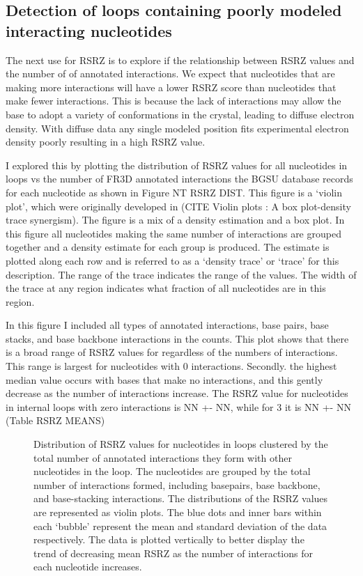 \subsection{Detection of loops containing poorly modeled interacting nucleotides}

The next use for RSRZ is to explore if the relationship between RSRZ values and
the number of of annotated interactions. We expect that nucleotides that are
making more interactions will have a lower RSRZ score than nucleotides that make
fewer interactions. This is because the lack of interactions may allow the base
to adopt a variety of conformations in the crystal, leading to diffuse electron
density. With diffuse data any single modeled position fits experimental
electron density poorly resulting in a high RSRZ value. 

I explored this by plotting the distribution of RSRZ values for all nucleotides
in loops vs the number of FR3D annotated interactions the BGSU database records
for each nucleotide as shown in Figure NT RSRZ DIST. This figure is a ‘violin
plot’, which were originally developed in (CITE Violin plots : A box
plot-density trace synergism). The figure is a mix of a density estimation and a
box plot. In this figure all nucleotides making the same number of interactions
are grouped together and a density estimate for each group is produced. The
estimate is plotted along each row and is referred to as a ‘density trace’ or
‘trace’ for this description. The range of the trace indicates the range of the
values. The width of the trace at any region indicates what fraction of all
nucleotides are in this region.

In this figure I included all types of annotated interactions, base pairs, base
stacks, and base backbone interactions in the counts. This plot shows that there
is a broad range of RSRZ values for regardless of the numbers of interactions.
This range is largest for nucleotides with 0 interactions.  Secondly. the
highest median value occurs with bases that make no interactions, and this
gently decrease as the number of interactions increase. The RSRZ value for
nucleotides in internal loops with zero interactions is NN +- NN, while for 3 it
is NN +- NN (Table RSRZ MEANS)

\begin{figure}
  \caption{ Distribution of RSRZ values for nucleotides in loops clustered by
    the total number of annotated interactions they form with other nucleotides
    in the loop. The nucleotides are grouped by the total number of interactions
    formed, including basepairs, base backbone, and base-stacking interactions.
    The distributions of the RSRZ values are represented as violin plots. The
    blue dots and inner bars within each ‘bubble’ represent the mean and
    standard deviation of the data respectively. The data is plotted vertically
    to better display the trend of decreasing mean RSRZ as the number of
  interactions for each nucleotide increases. }
\end{figure}

